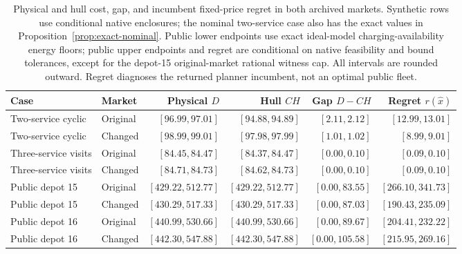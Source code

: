 \begin{table}[t]
\centering\scriptsize
\setlength{\tabcolsep}{3pt}
\caption{Physical and hull cost, gap, and incumbent fixed-price regret in both archived markets. Synthetic rows use conditional native enclosures; the nominal two-service case also has the exact values in Proposition~\ref{prop:exact-nominal}. Public lower endpoints use exact ideal-model charging-availability energy floors; public upper endpoints and regret are conditional on native feasibility and bound tolerances, except for the depot-15 original-market rational witness cap. All intervals are rounded outward. Regret diagnoses the returned planner incumbent, not an optimal public fleet.}
\label{tab:joint-support}
\begin{tabular}{llrrrr}
\toprule
Case & Market & Physical $D$ & Hull $CH$ & Gap $D-CH$ & Regret $r(\hat x)$\\
\midrule
Two-service cyclic & Original & $[96.99,97.01]$ & $[94.88,94.89]$ & $[2.11,2.12]$ & $[12.99,13.01]$\\
Two-service cyclic & Changed & $[98.99,99.01]$ & $[97.98,97.99]$ & $[1.01,1.02]$ & $[8.99,9.01]$\\
\addlinespace
Three-service visits & Original & $[84.45,84.47]$ & $[84.37,84.47]$ & $[0.00,0.10]$ & $[0.09,0.10]$\\
Three-service visits & Changed & $[84.71,84.73]$ & $[84.62,84.73]$ & $[0.00,0.10]$ & $[0.09,0.10]$\\
\addlinespace
Public depot 15 & Original & $[429.22,512.77]$ & $[429.22,512.77]$ & $[0.00,83.55]$ & $[266.10,341.73]$\\
Public depot 15 & Changed & $[430.29,517.33]$ & $[430.29,517.33]$ & $[0.00,87.03]$ & $[190.43,235.09]$\\
\addlinespace
Public depot 16 & Original & $[440.99,530.66]$ & $[440.99,530.66]$ & $[0.00,89.67]$ & $[204.41,232.22]$\\
Public depot 16 & Changed & $[442.30,547.88]$ & $[442.30,547.88]$ & $[0.00,105.58]$ & $[215.95,269.16]$\\
\bottomrule
\end{tabular}
\end{table}
